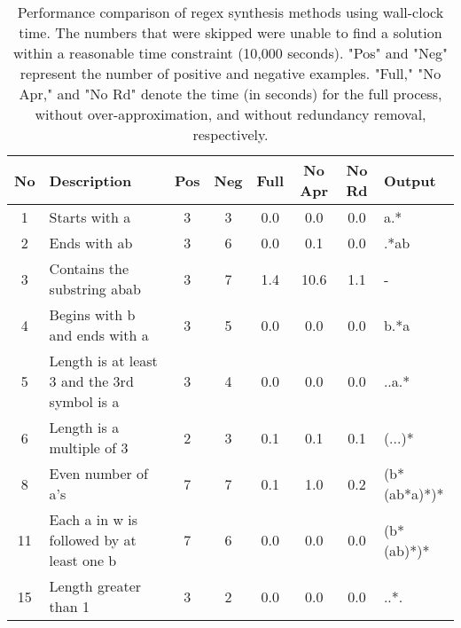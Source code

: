 \begin{table}[h!]
\centering
\label{tab:alpha_regex_performance_times}
\caption{Performance comparison of regex synthesis methods using wall-clock time. The numbers that were skipped were unable to find a solution within a reasonable time constraint (10,000 seconds). "Pos" and "Neg" represent the number of positive and negative examples. "Full," "No Apr," and "No Rd" denote the time (in seconds) for the full process, without over-approximation, and without redundancy removal, respectively.}
\begin{tabular}{|c|p{5cm}|c|c|c|c|c|p{2.5cm}|}
\hline

\textbf{No} & \textbf{Description} & \textbf{Pos} & \textbf{Neg}  & \textbf{Full} & \textbf{No Apr} & \textbf{No Rd} & \textbf{Output} \\
\hline
1 & Starts with a & 3 & 3 & 0.0 & 0.0 & 0.0 & a.* \\
2 & Ends with ab & 3 & 6 & 0.0 & 0.1 & 0.0 & .*ab \\
3 & Contains the substring abab & 3 & 7 & 1.4 & 10.6 & 1.1 & - \\
4 & Begins with b and ends with a & 3 & 5 & 0.0 & 0.0 & 0.0 & b.*a \\
5 & Length is at least 3 and the 3rd symbol is a & 3 & 4 & 0.0 & 0.0 & 0.0 & ..a.* \\
6 & Length is a multiple of 3 & 2 & 3 & 0.1 & 0.1 & 0.1 & (...)* \\
8 & Even number of a's & 7 & 7 & 0.1 & 1.0 & 0.2 & (b*(ab*a)*)* \\
11 & Each a in w is followed by at least one b & 7 & 6 & 0.0 & 0.0 & 0.0 & (b*(ab)*)* \\
15 & Length greater than 1 & 3 & 2 & 0.0 & 0.0 & 0.0 & ..*. \\
\hline
\end{tabular}
\end{table}

